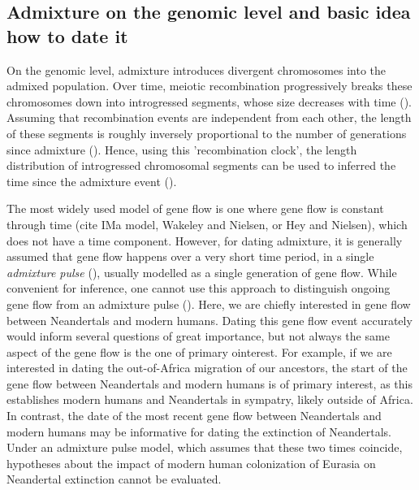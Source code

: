 \documentclass[]{article}
\begin{document}
\subsection{Admixture on the genomic level and basic idea how to date
it}\label{admixture-on-the-genomic-level-and-basic-idea-how-to-date-it}

On the genomic level, admixture introduces  divergent chromosomes
 into the admixed population. Over time, meiotic recombination
progressively breaks these chromosomes down into introgressed segments, whose size decreases with time (\cite{falush_inference_2003}). 
Assuming that recombination events are
independent from each other, the length of these segments  is roughly inversely proportional to  the number of
generations since admixture
(\cite{moorjani_history_2011,pool_inference_2009,gravel_population_2012,liang_lengths_2014}).
Hence, using this 'recombination clock', the length distribution of introgressed chromosomal segments
 can be used to inferred the time since the
admixture event 
(\cite{moorjani_history_2011,pugach_dating_2011,sankararaman_date_2012,loh_inferring_2013,sankararaman_combined_2016,pugach_gateway_2018,jacobs_multiple_2019,hellenthal_genetic_2014}).

The most widely used model of gene flow is one where gene flow is constant through time (cite IMa model, Wakeley and Nielsen, or Hey and Nielsen), which does not have a time component. However, for dating admixture, it is generally assumed that gene flow
happens over a very short time period, in a single \textit{admixture pulse}
(\cite{moorjani_history_2011}), usually modelled as a single generation
of gene flow. While convenient for inference, one cannot use this approach to distinguish ongoing gene flow from an admixture pulse (\cite{pickrell_toward_2014}). Here, we are chiefly interested in gene flow between Neandertals and modern humans. Dating this gene flow event accurately would inform several questions of  great importance, but not always the same aspect of the gene flow is the one of primary ointerest. For example, if we are interested in dating the out-of-Africa migration of our ancestors, the start of the gene flow between Neandertals and modern humans is of primary interest, as this establishes modern humans and Neandertals in sympatry, likely outside of Africa.
In contrast, the date of the most recent gene flow between Neandertals and modern humans may be informative for dating the extinction of Neandertals. Under an admixture pulse model, which assumes that these two times coincide, hypotheses about the impact of modern human colonization of Eurasia on Neandertal extinction cannot be evaluated.
\end{document}
